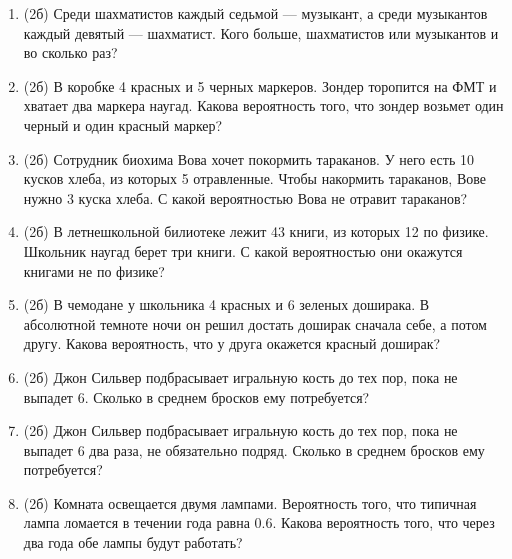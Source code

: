 \documentclass[a4paper, 12pt]{article}
\begin{document}
\begin{enumerate}
  \item (2б) Среди шахматистов каждый седьмой — музыкант, а среди музыкантов каждый девятый — шахматист. Кого больше, шахматистов или музыкантов и во сколько раз?
  \item (2б) В коробке 4 красных и 5 черных маркеров.
  Зондер торопится на ФМТ и хватает два маркера наугад.
  Какова вероятность того, что зондер возьмет один черный и один красный маркер?
  \item (2б) Сотрудник биохима Вова хочет покормить тараканов.
  У него есть 10 кусков хлеба, из которых 5 отравленные. Чтобы накормить тараканов,
  Вове нужно 3 куска хлеба. С какой вероятностью Вова не отравит тараканов?
  \item (2б) В летнешкольной билиотеке лежит 43 книги, из которых 12 по физике.
  Школьник наугад берет три книги. С какой вероятностью они окажутся книгами не по физике?
  \item (2б) В чемодане у школьника 4 красных и 6 зеленых доширака.
  В абсолютной темноте ночи он решил достать доширак сначала себе, а потом другу.
  Какова вероятность, что у друга окажется красный доширак?
  \item (2б) Джон Сильвер подбрасывает игральную кость до тех пор, пока не выпадет 6. Сколько в среднем бросков ему потребуется?
  \item (2б) Джон Сильвер подбрасывает игральную кость до тех пор, пока не выпадет 6 два раза, не обязательно подряд. Сколько в среднем бросков ему потребуется?
  \item (2б) Комната освещается двумя лампами. Вероятность того,
  что типичная лампа ломается в течении года равна 0.6.
  Какова вероятность того, что через два года обе лампы будут работать?
\end{enumerate}
\end{document}
